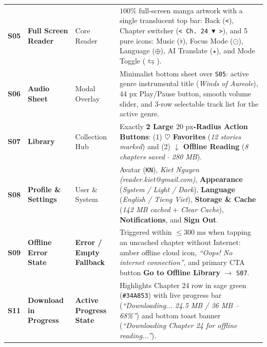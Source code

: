 \begin{table}[H]
\begin{tabularx}{\textwidth}{C{1.1cm} L{2.8cm} C{2.1cm} Y}
\textbf{S05} & \textbf{Full Screen Reader} & Core Reader & $100\%$ full-screen manga artwork with a single translucent top bar: Back (\texttt{<}), Chapter switcher (\texttt{< Ch.\ 24 $\blacktriangledown$ >}), and 5 pure icons: Music ($\flat$), Focus Mode ($\odot$), Language ($\oplus$), AI Translate ($\star$), and Mode Toggle ($\leftrightarrows$). \\
\textbf{S06} & \textbf{Audio Sheet} & Modal Overlay & Minimalist bottom sheet over \texttt{S05}: active genre instrumental title (\textit{Winds of Aureole}), $44\text{ px}$ Play/Pause button, smooth volume slider, and 3-row selectable track list for the active genre. \\
\textbf{S07} & \textbf{Library} & Collection Hub & Exactly \textbf{2 Large $20\text{ px}$-Radius Action Buttons}: (1) \textbf{$\heartsuit$ Favorites} (\textit{12 stories marked}) and (2) \textbf{$\downarrow$ Offline Reading} (\textit{8 chapters saved $\cdot$ 280 MB}). \\
\textbf{S08} & \textbf{Profile \& Settings} & User \& System & Avatar (\texttt{KN}), \textit{Kiet Nguyen (reader.kiet@gmail.com)}, \textbf{Appearance} (\textit{System / Light / Dark}), \textbf{Language} (\textit{English / Tieng Viet}), \textbf{Storage \& Cache} (\textit{142 MB cached} + \textit{Clear Cache}), \textbf{Notifications}, and \textbf{Sign Out}. \\
\textbf{S09} & \textbf{Offline Error State} & \textbf{Error / Empty Fallback} & Triggered within $\le 300\text{ ms}$ when tapping an uncached chapter without Internet: amber offline cloud icon, \textit{``Oops! No internet connection''}, and primary CTA button \textbf{Go to Offline Library} $\to$ \texttt{S07}. \\
\textbf{S11} & \textbf{Download in Progress} & \textbf{Active Progress State} & Highlights Chapter 24 row in sage green (\texttt{\#34A853}) with live progress bar (\textit{``Downloading... 24.5 MB / 36 MB -- 68\%''}) and bottom toast banner (\textit{``Downloading Chapter 24 for offline reading...''}). \\
\bottomrule
\end{tabularx}
\end{table}
